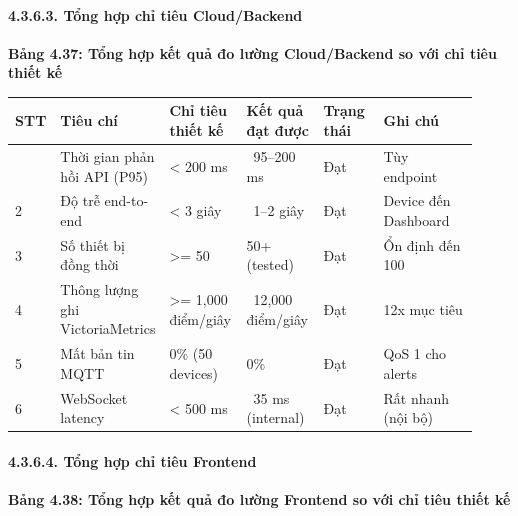 \documentclass[13pt,a4paper]{extarticle}
\newcounter{none} %
\newcommand{\thesislongtableorignewline}{}
\let\thesislongtableorignewline\\
\renewcommand{\\}{\thesislongtableorignewline\hline}%
\let\\\thesislongtableorignewline
\newcommand{\thesistabletitle}[1]{%
  \begin{center}\textbf{#1}\end{center}%
}
\begin{document}
\paragraph{4.3.6.3. Tổng hợp chỉ tiêu
Cloud/Backend}\label{4363-tux1ed5ng-hux1ee3p-chux1ec9-tiuxeau-cloudbackend}

\thesistabletitle{Bảng 4.37: Tổng hợp kết quả đo lường Cloud/Backend so với chỉ tiêu
thiết kế}

{\def\LTcaptype{none} %
\begin{longtable}{|p{0.06\linewidth}|p{0.14\linewidth}|p{0.17\linewidth}|p{0.17\linewidth}|p{0.14\linewidth}|p{0.24\linewidth}|}
\hline \textbf{STT} & \textbf{Tiêu chí} & \textbf{Chỉ tiêu thiết kế} & \textbf{Kết quả đạt được} & \textbf{Trạng thái} & \textbf{Ghi
chú} \\
\hline
\endhead
\hline
\endlastfoot
1 & Thời gian phản hồi API (P95) & \textless{} 200 ms &
~95--200 ms & Đạt & Tùy endpoint \\
2 & Độ trễ end-to-end & \textless{} 3 giây & ~1--2 giây &
Đạt & Device đến Dashboard \\
3 & Số thiết bị đồng thời & \textgreater= 50 & 50+ (tested) & Đạt & Ổn
định đến 100 \\
4 & Thông lượng ghi VictoriaMetrics & \textgreater= 1,000 điểm/giây &
~12,000 điểm/giây & Đạt & 12x mục tiêu \\
5 & Mất bản tin MQTT & 0\% (50 devices) & 0\% & Đạt & QoS 1 cho
alerts \\
6 & WebSocket latency & \textless{} 500 ms & ~35 ms
(internal) & Đạt & Rất nhanh (nội bộ) \\
\end{longtable}
}

\paragraph{4.3.6.4. Tổng hợp chỉ tiêu
Frontend}\label{4364-tux1ed5ng-hux1ee3p-chux1ec9-tiuxeau-frontend}

\thesistabletitle{Bảng 4.38: Tổng hợp kết quả đo lường Frontend so với chỉ tiêu thiết
kế}
\end{document}

